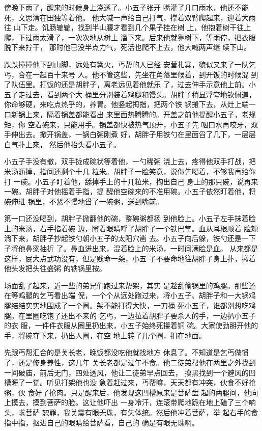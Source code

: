 傍晚下雨了，醒来的时候身上浇透了。小五子张开
嘴灌了几口雨水，他还不能死，文思清在田独等着他。
他大喊一声给自己打气，撑着双臂爬起来，迎着大雨往
山下走。饥肠辘辘，找到半山腰才看到几个果子挂在树
上，他抱着树干往上爬，下过雨太滑了，一次次地从树上
溜下来。后来他就靠树下，等雨停，把衣服脱下来拧干，
那时他已没半点力气，死活也爬不上去，他大喊两声继
续下山。

跌跌撞撞他下到山脚，远处有篝火，丐帮的人已经
安营扎寨，貌似又来了一队乞丐，合在一起百十来号
人。他不管这些，先坐在角落里候着，到开饭的时候混
到了队伍里。打饭的还是胡胖子，离老远见着他就乐
了，过去伸手示意他上前。小五子走过去，看到两个大
桶里分别装着鸡腿和馒头。胡胖子稍显浮夸地钦佩道，
你命够硬，来吃点热乎的，养胃。他竖起拇指，把两个铁
锅搬下去，从灶上端一口新锅上来，隔着锅盖都能看出
来里面热腾腾的。开盖之前他提醒小五子，老规矩，你
空着碗来，只能用手。锅盖都快被热气顶开，小五子先
咽口水再咬牙，双手伸出去。掀开锅盖，一锅白粥刚煮
好，胡胖子用铁勺在里面舀了几下，一层层白气扑上來，
然后他抬头看小五子。

小五子手没有撤，双手拢成碗状等着他，一勺稀粥
浇上去，疼得他双手打战，把米汤沥掉，指间还剩个十几
粒米。胡胖子一脸笑意，说你先喝着，不够我再给你打
一碗。小五子盯着他，舔掉手上的十几粒米，掏出自己
身上的那只碗，说再来一碗。胡胖子对他摇着手指，提
醒他空碗来的不准用碗。小五子依然盯着他，将碗伸进
锅里，不紧不慢地舀了一碗粥，送到嘴前。

第一口还没喝到，胡胖子掀翻他的碗，整碗粥都扬
到他脸上。小五子左手抹着脸上的米汤，右手掐着碗
边，瞪着眼睛呼了胡胖子一个铁巴掌。血从耳根顺着
脸颊淌下来，胡胖子抄起铁勺朝小五子的太阳穴凿
去。小五子向后躲，铁勺还是一下子将他鼻梁抽折
了。鼻血迸出来，混着脸上的米汤，一时间满脸是血。
从来都是这样，屁大点武功没有，但是贱命一条，小五
子不要命地往胡胖子身上扑，揪着他头发把头往盛粥
的铁锅里按。

场面乱了起来，近一些的弟兄们跑过来帮架，其实
是趁乱偷锅里的鸡腿。那些还在等鸡腿的乞丐看出端
倪，一个个从远处跑过来，将小五子、胡胖子和一大锅鸡
腿结结实实地围成了一个圈。架不能打得大快，一刀捅
死小五子，谁都别想吃鸡腿。在里圈吃饱了还出不来的
乞丐，一边拉着胡胖子要杀人的手，一边扒小五子的衣
服，一件件衣服从圈里扔出来，小五子始终死攥着铜
碗。大家使劲掰开他的手，将碗夺下来，扔出人圈，在空
地上转了几个圈，扣在地面。

先跟丐帮汇合的是关长老，晚饭都没吃他就找地方
休息了。不知道是乞丐做惯了，还是修身养性，这几年
关长老都是过午不食。他二徒弟帮他在两里之外找到
一间破庙，前后无门，四处透风，他让二徒弟早点回去，
摸黑找到一个避风的凹槽睡了一觉。听见打架他也没
急着赶过来，丐帮嘛，天天都有冲突，伙食不好抢粥，伙
食好了抢肉。只是醒来后，他发现这凹槽原来是菩萨盘
起的两腿间，他向上摸去，摸到菩萨的脸。这让他吓出
一身冷汗，连滚带爬地跪在地上磕了三个响头，求菩萨
恕罪，我关震有眼无珠，有失体统。然后他冲着菩萨，举
起右手的食指中指，抠进自己的眼睛给菩萨看，自己的
确是有眼无珠啊。

